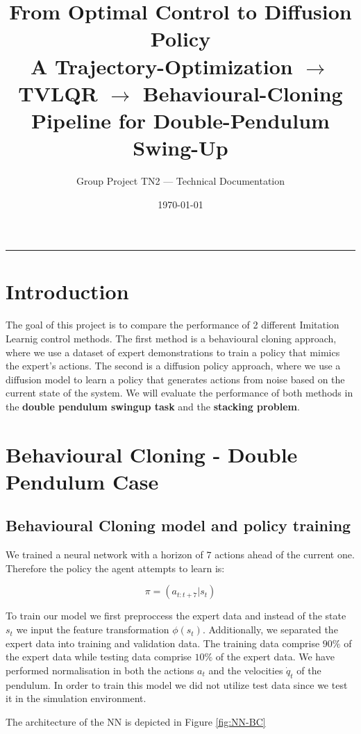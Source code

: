 \documentclass[11pt,a4paper]{article}
\title{\textbf{From Optimal Control to Diffusion Policy}\\[2pt]
\large A Trajectory-Optimization $\rightarrow$ TVLQR $\rightarrow$
Behavioural-Cloning Pipeline for Double-Pendulum Swing-Up}
\author{Group Project TN2 --- Technical Documentation}
\date{\today}
\begin{document}
\maketitle
\clearpage

\tableofcontents
\bigskip
\hrule

\clearpage
\section{Introduction}
The goal of this project is to compare the performance of 2 different Imitation Learnig control methods.
 The first method is a behavioural cloning approach, 
where we use a dataset of expert demonstrations to train a policy 
that mimics the expert's actions. The second is a diffusion policy approach,
where we use a diffusion model to learn a policy that generates actions from noise 
based on the current state of the system.
 We will evaluate the performance of both methods
in the \textbf{double pendulum swingup task} and the \textbf{stacking problem}.

\section{Behavioural Cloning - Double Pendulum Case}
\subsection{Behavioural Cloning model and policy training}
We trained a neural network with a horizon of $7$ actions ahead of the current one. Therefore the policy the agent attempts to learn is:

\begin{equation}
    \pi = (a_{t:t+7}|s_t)
\end{equation}

To train our model we first preproccess the expert data and instead of the state $s_t$ we input the feature transformation $\phi(s_t)$. Additionally, we separated the expert data into training and validation data. The training data comprise $90\%$ of the expert data  while testing data comprise $10\%$ of the expert data. We have performed normalisation in both the actions $a_t$ and the velocities $\dot{q}_t$ of the pendulum. In order to train this model we did not utilize test data since we test it in the simulation environment.

The architecture of the NN is depicted in Figure \ref{fig:NN-BC}
\end{document}
